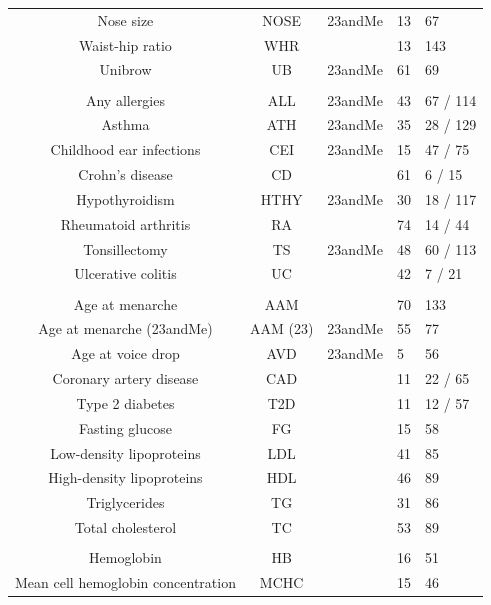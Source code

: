 \documentclass[11pt,titlepage]{article}
\begin{document}
\begin{table}[htp]
\begin{center}
{\begin{tabular}{|c|c| C{3.5cm}| C{2cm}| C{3cm}| }
Nose size & NOSE & 23andMe&13 & 67 \\ 
Waist-hip ratio & WHR & \citep{Shungin:2015aa}  & 13 & 143 \\ 
Unibrow & UB& 23andMe&61 & 69 \\ 
\hline
{} \\
\hline
Any allergies & ALL & 23andMe& 43 & 67 / 114 \\ 
Asthma & ATH & 23andMe & 35 & 28 / 129 \\ 
Childhood ear infections & CEI& 23andMe& 15 & 47 / 75\\ 
Crohn's disease & CD &  \citep{jostins2012host} & 61 & 6 / 15  \\ 
Hypothyroidism & HTHY& 23andMe &30 & 18 / 117 \\
Rheumatoid arthritis & RA & \citep{Okada:2014aa} & 74 &14 / 44 \\
Tonsillectomy & TS & 23andMe&  48 & 60 / 113\\ 
Ulcerative colitis & UC &  \citep{jostins2012host} & 42 & 7 / 21 \\ 
\hline
{} \\
\hline
Age at menarche & AAM &\citep{Perry:2014aa} & 70 & 133 \\ 
Age at menarche (23andMe) & AAM (23) & 23andMe & 55 & 77 \\ 
Age at voice drop & AVD & 23andMe & 5 & 56 \\ 
Coronary artery disease & CAD & \citep{Schunkert:2011aa} & 11 & 22 / 65\\ 
Type 2 diabetes & T2D & \citep{Morris:2012aa} & 11  & 12 / 57\\ 
Fasting glucose & FG& \citep{manning2012genome}& 15 & 58 \\ 
Low-density lipoproteins & LDL & \citep{teslovich2010biological} & 41 & 85 \\ 
High-density lipoproteins & HDL & \citep{teslovich2010biological} & 46 & 89\\ 
Triglycerides & TG &\citep{teslovich2010biological} & 31 & 86 \\ 
Total cholesterol & TC & \citep{teslovich2010biological} & 53 & 89 \\ 
\hline
  \\
\hline
Hemoglobin & HB & \citep{van2012seventy} & 16 & 51 \\ 
Mean cell hemoglobin concentration & MCHC & \citep{van2012seventy}& 15 & 46 \\ 

\end{tabular}}
\end{center}
\end{table}
\end{document}
